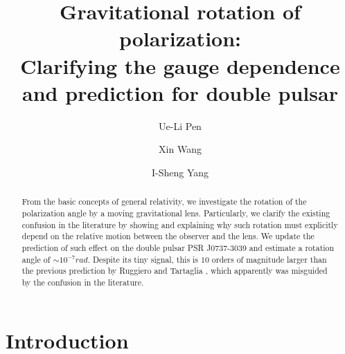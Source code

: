 \documentclass[aps,showpacs,twocolumn,floats,prd,superscriptaddress,nofootinbib]{revtex4-1}
\begin{document}
\title{Gravitational rotation of polarization: \\ 
Clarifying the gauge dependence and prediction for double pulsar}

\author{Ue-Li Pen}

\author{Xin Wang}

\author{I-Sheng Yang}

\begin{abstract}
From the basic concepts of general relativity, we investigate the rotation of the polarization angle by a moving gravitational lens. 
Particularly, we clarify the existing confusion in the literature by showing and explaining why such rotation must explicitly depend on the relative motion between the observer and the lens. 
We update the prediction of such effect on the double pulsar PSR J0737-3039 and estimate a rotation angle of $\sim 10^{-7}rad$. 
Despite its tiny signal, this is $10$ orders of magnitude larger than the previous prediction by Ruggiero and Tartaglia \cite{RugTar06}, which apparently was misguided by the confusion in the literature. 
\end{abstract}

\maketitle

\section{Introduction}
\end{document}
